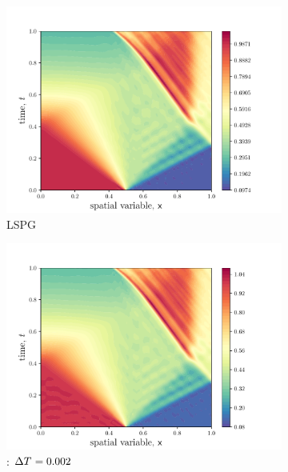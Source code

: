\begin{figure}
\begin{center}
\begin{subfigure}[t]{0.48\textwidth}
\includegraphics[width=1.\linewidth]{figs/sod/xt_lspg.pdf}
\caption{LSPG}
\end{subfigure}
\begin{subfigure}[t]{0.48\textwidth}
\includegraphics[width=1.\linewidth]{figs/sod/xt_w1.pdf}
\caption{\methodAcronym: $\Delta T^{}= 0.002$}
\end{subfigure}
\begin{subfigure}[t]{0.48\textwidth}

\end{subfigure}
\end{center}
\end{figure}
